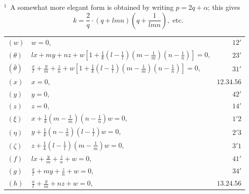 \documentclass[11pt,a4paper]{book}
\begin{document}
\noindent$^1$~A somewhat more elegant form is obtained by writing $p = 2q + \alpha$; this gives
\[
k = \frac{2}{q} \cdot (q + lmn)\left(q + \frac{1}{lmn}\right), \text{ etc.}
\]
\medskip

\begin{center}
\begin{tabular}{@{}l@{\qquad}l@{\qquad}r@{}}
$(w)$ & $w = 0$, & $12'$ \\[4pt]
$(\theta)$ & $\displaystyle lx + my + nz + w\left[1 + \frac{1}{k}\left(l - \frac{1}{l}\right)\left(m - \frac{1}{m}\right)\left(n - \frac{1}{n}\right)\right] = 0$, & $23'$ \\[4pt]
$(\bar{\theta})$ & $\displaystyle \frac{x}{l} + \frac{y}{m} + \frac{z}{n} + w\left[1 + \frac{1}{k}\left(l - \frac{1}{l}\right)\left(m - \frac{1}{m}\right)\left(n - \frac{1}{n}\right)\right] = 0$, & $31'$ \\[4pt]
$(x)$ & $x = 0$, & $12.34.56$ \\[4pt]
$(y)$ & $y = 0$, & $42'$ \\[4pt]
$(z)$ & $z = 0$, & $14'$ \\[4pt]
$(\xi)$ & $\displaystyle x + \frac{1}{k}\left(m - \frac{1}{m}\right)\left(n - \frac{1}{n}\right)w = 0$, & $1'2$ \\[4pt]
$(\eta)$ & $\displaystyle y + \frac{1}{k}\left(n - \frac{1}{n}\right)\left(l - \frac{1}{l}\right)w = 0$, & $2'3$ \\[4pt]
$(\zeta)$ & $\displaystyle z + \frac{1}{k}\left(l - \frac{1}{l}\right)\left(m - \frac{1}{m}\right)w = 0$, & $3'1$ \\[4pt]
$(f)$ & $\displaystyle lx + \frac{y}{m} + \frac{z}{n} + w = 0$, & $41'$ \\[4pt]
$(g)$ & $\displaystyle \frac{x}{l} + my + \frac{z}{n} + w = 0$, & $34'$ \\[4pt]
$(h)$ & $\displaystyle \frac{x}{l} + \frac{y}{m} + nz + w = 0$, & $13.24.56$
\end{tabular}
\end{center}
\end{document}
